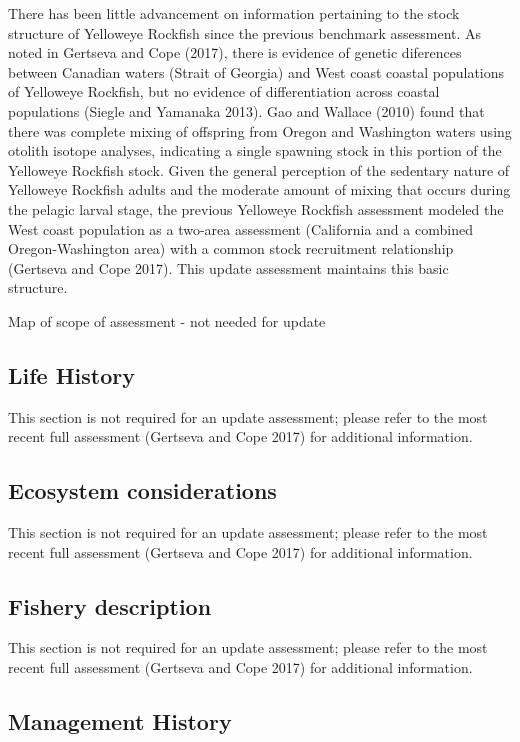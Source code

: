\documentclass[
]{scrartcl}
\begin{document}
There has been little advancement on information pertaining to the stock
structure of Yelloweye Rockfish since the previous benchmark assessment.
As noted in Gertseva and Cope (2017), there is evidence of genetic
diferences between Canadian waters (Strait of Georgia) and West coast
coastal populations of Yelloweye Rockfish, but no evidence of
differentiation across coastal populations (Siegle and Yamanaka 2013).
Gao and Wallace (2010) found that there was complete mixing of offspring
from Oregon and Washington waters using otolith isotope analyses,
indicating a single spawning stock in this portion of the Yelloweye
Rockfish stock. Given the general perception of the sedentary nature of
Yelloweye Rockfish adults and the moderate amount of mixing that occurs
during the pelagic larval stage, the previous Yelloweye Rockfish
assessment modeled the West coast population as a two-area assessment
(California and a combined Oregon-Washington area) with a common stock
recruitment relationship (Gertseva and Cope 2017). This update
assessment maintains this basic structure.

Map of scope of assessment - not needed for update

\subsection{Life History}\label{life-history}

This section is not required for an update assessment; please refer to
the most recent full assessment (Gertseva and Cope 2017) for additional
information.

\subsection{Ecosystem considerations}\label{ecosystem-considerations-1}

This section is not required for an update assessment; please refer to
the most recent full assessment (Gertseva and Cope 2017) for additional
information.

\subsection{Fishery description}\label{fishery-description}

This section is not required for an update assessment; please refer to
the most recent full assessment (Gertseva and Cope 2017) for additional
information.

\subsection{Management History}\label{management-history}
\end{document}
